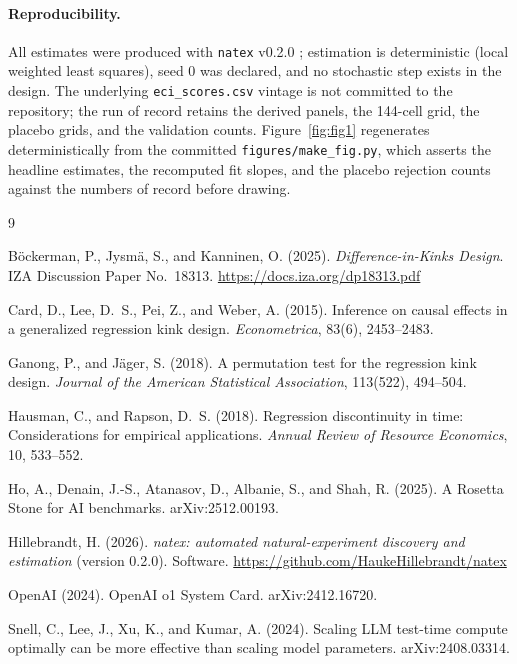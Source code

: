 \documentclass[11pt]{article}
\newcommand{\natex}{\texttt{natex}}
\begin{document}
\paragraph{Reproducibility.} All estimates were produced with \natex{} v0.2.0
\cite{natex}; estimation is deterministic (local weighted least squares),
seed 0 was declared, and no stochastic step exists in the design. The
underlying \texttt{eci\_scores.csv} vintage is not committed to the
repository; the run of record retains the derived panels, the 144-cell grid,
the placebo grids, and the validation counts. Figure~\ref{fig:fig1}
regenerates deterministically from the committed
\texttt{figures/make\_fig.py}, which asserts the headline estimates, the
recomputed fit slopes, and the placebo rejection counts against the numbers
of record before drawing.

\footnotesize
\begin{thebibliography}{9}
\setlength{\itemsep}{2pt}\setlength{\parskip}{0pt}

B\"ockerman, P., Jysm\"a, S., and Kanninen, O. (2025).
\emph{Difference-in-Kinks Design}.
IZA Discussion Paper No.~18313.
\url{https://docs.iza.org/dp18313.pdf}

Card, D., Lee, D.~S., Pei, Z., and Weber, A. (2015).
Inference on causal effects in a generalized regression kink design.
\emph{Econometrica}, 83(6), 2453--2483.

Ganong, P., and J\"ager, S. (2018).
A permutation test for the regression kink design.
\emph{Journal of the American Statistical Association}, 113(522), 494--504.

Hausman, C., and Rapson, D.~S. (2018).
Regression discontinuity in time: Considerations for empirical applications.
\emph{Annual Review of Resource Economics}, 10, 533--552.

Ho, A., Denain, J.-S., Atanasov, D., Albanie, S., and Shah, R. (2025).
A Rosetta Stone for AI benchmarks.
arXiv:2512.00193.

Hillebrandt, H. (2026).
\emph{natex: automated natural-experiment discovery and estimation} (version
0.2.0). Software.
\url{https://github.com/HaukeHillebrandt/natex}

OpenAI (2024).
OpenAI o1 System Card.
arXiv:2412.16720.

Snell, C., Lee, J., Xu, K., and Kumar, A. (2024).
Scaling LLM test-time compute optimally can be more effective than scaling
model parameters.
arXiv:2408.03314.

\end{thebibliography}
\end{document}
